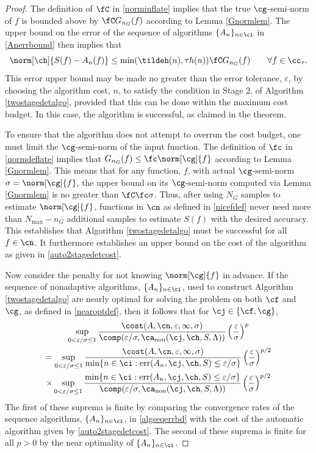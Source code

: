 \documentclass[]{elsarticle}
\DeclareMathOperator{\fix}{non}
\DeclareMathOperator{\err}{err}
\theoremstyle{definition}
\theoremstyle{remark}
\begin{document}
\begin{proof} The definition of $\fC$ in \eqref{norminflate} implies that the true $\cg$-semi-norm of $f$ is bounded above by $\fC G_{n_G}(f)$ according to Lemma \ref{Gnormlem}.  The upper bound on the error of the sequence of algorithms $\{A_n\}_{n \in \ci}$ in \eqref{Anerrbound} then implies that 
\[
\norm[\ch]{S(f) -  A_n(f)} \le \min(\tildeh(n),\tau h(n)) \fC G_{n_G}(f) \qquad \forall f \in \cc_{\tau}.
\]
This error upper bound may be made no greater than the error tolerance, $\varepsilon$, by choosing the algorithm cost, $n$, to satisfy the condition in Stage 2. of Algorithm \ref{twostagedetalgo}, provided that this can be done within the maximum cost budget.  In this case, the algorithm is successful, as claimed in the theorem.

To ensure that the algorithm does not attempt to overrun the cost budget, one must limit the $\cg$-semi-norm of the input function.  The definition of  $\fc$ in \eqref{normdeflate} implies that $G_{n_G}(f) \le \fc\norm[\cg]{f}$ according to Lemma \ref{Gnormlem}. This means that for any function, $f$, with actual $\cg$-semi-norm $\sigma=\norm[\cg]{f}$, the upper bound on its $\cg$-semi-norm computed via Lemma \ref{Gnormlem} is no greater than $\fC \fc \sigma$.  Thus, after using $N_G$ samples to estimate $\norm[\cg]{f}$, functions in $\cn$ as defined in \eqref{nicefdef} never need more than $N_{\max} - n_G$ additional samples to estimate $S(f)$ with the desired accuracy.  This establishes that Algorithm \ref{twostagedetalgo} must be successful for all $f \in \cn$.  It furthermore establishes an upper bound on the cost of the algorithm as given in \eqref{auto2stagedetcost}.

Now consider the penalty for not knowing $\norm[\cg]{f}$ in advance.  If the sequence of nonadaptive algorithms, $\{A_n\}_{n \in \ci}$, used to construct Algorithm \ref{twostagedetalgo} are nearly optimal for solving the problem on both $\cf$ and $\cg$, as defined in \eqref{nearoptdef}, then it follows that for $\cj \in \{\cf,\cg\}$,
\begin{multline*}
\sup_{0 < \varepsilon/\sigma \le 1} \frac{\cost(A,\cn,\varepsilon,\infty,\sigma)} {\comp(\varepsilon/\sigma,\ca_{\fix}(\cj,\ch,S,\Lambda))} \left(\frac{\varepsilon}{\sigma}\right)^{p} \\
= \sup_{0 < \varepsilon/\sigma \le 1} \frac{\cost(A,\cn,\varepsilon,\infty,\sigma)}{\min\{n \in \ci : \err(A_n,\cj,\ch,S) \le \varepsilon/\sigma\}} \left(\frac{\varepsilon}{\sigma}\right)^{p/2}  \\
 \times \sup_{0 < \varepsilon/\sigma \le 1} \frac{\min\{n \in \ci : \err(A_n,\cj,\ch,S) \le \varepsilon/\sigma\}} {\comp(\varepsilon/\sigma,\ca_{\fix}(\cj,\ch,S,\Lambda))} \left(\frac{\varepsilon}{\sigma}\right)^{p/2}
\end{multline*} 
The first of these suprema is finite by comparing the convergence rates of the sequence algorithms, $\{A_n\}_{n \in \ci}$, in \eqref{algseqerrbd} with the cost of the automatic algorithm given by \eqref{auto2stagedetcost}. The second of these suprema is finite for all $p>0$ by the near optimality of $\{A_n\}_{n \in \ci}$.  
\end{proof}
\end{document}
